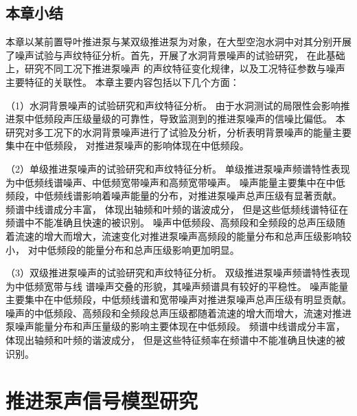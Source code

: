 \section{本章小结}
本章以某前置导叶推进泵与某双级推进泵为对象，在大型空泡水洞中对其分别开展
了噪声试验与声纹特征分析。首先，开展了水洞背景噪声的试验研究，
在此基础上，研究不同工况下推进泵噪声
的声纹特征变化规律，以及工况特征参数与噪声主要特征的关联性。
本章主要内容包括以下几个方面：

（1）水洞背景噪声的试验研究和声纹特征分析。
由于水洞测试的局限性会影响推进泵中低频段声压级量级的可靠性，导致监测到的推进泵噪声的信噪比偏低。
本研究对多工况下的水洞背景噪声进行了试验及分析，分析表明背景噪声的能量主要集中在中低频段，
对推进泵噪声的影响体现在中低频段。

（2）单级推进泵噪声的试验研究和声纹特征分析。
单级推进泵噪声频谱特性表现为中低频线谱噪声、中低频宽带噪声和高频宽带噪声。
噪声能量主要集中在中低频段，中低频线谱影响着噪声能量的分布，对推进泵噪声总声压级有显著贡献。
频谱中线谱成分丰富，
体现出轴频和叶频的谐波成分，
但是这些低频线谱特征在频谱中不能准确且快速的被识别。
噪声中低频段、高频段和全频段的总声压级随着流速的增大而增大，流速变化对推进泵噪声高频段的能量分布和总声压级影响较小，
对中低频段的能量分布和总声压级影响更加明显。

（3）双级推进泵噪声的试验研究和声纹特征分析。
双级推进泵噪声频谱特性表现为中低频宽带与线
谱噪声交叠的形貌，其噪声频谱具有较好的平稳性。
噪声能量主要集中在中低频段，中低频线谱和宽带噪声对推进泵噪声总声压级有明显贡献。
噪声的中低频段、高频段和全频段总声压级都随着流速的增大而增大，流速对推进泵噪声能量分布和声压量级的影响主要体现在中低频段。
频谱中线谱成分丰富，体现出轴频和叶频的谐波成分，
但是这些特征频率在频谱中不能准确且快速的被识别。

\chapter{推进泵声信号模型研究}
